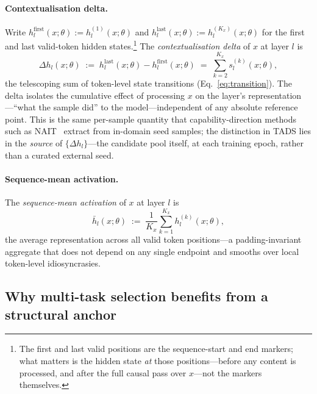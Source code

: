 \paragraph{Contextualisation delta.}
Write $h_l^{\mathrm{first}}(x;\theta) := h_l^{(1)}(x;\theta)$ and
$h_l^{\mathrm{last}}(x;\theta) := h_l^{(K_x)}(x;\theta)$ for the
first and last valid-token hidden states.\footnote{The first and
last valid positions are the sequence-start and end markers; what
matters is the hidden state \emph{at} those positions---before any
content is processed, and after the full causal pass over
$x$---not the markers themselves.} The \emph{contextualisation
delta} of $x$ at layer $l$ is
\begin{equation}
  \Delta h_l(x;\theta) \;:=\;
  h_l^{\mathrm{last}}(x;\theta) - h_l^{\mathrm{first}}(x;\theta)
  \;=\; \sum_{k=2}^{K_x} s_l^{(k)}(x;\theta),
  \label{eq:delta}
\end{equation}
the telescoping sum of token-level state transitions
(Eq.~\ref{eq:transition}). The delta isolates the cumulative effect
of processing $x$ on the layer's representation---``what the sample
did'' to the model---independent of any absolute reference point.
This is the same per-sample quantity that capability-direction
methods such as NAIT~\citep{nait2026} extract from in-domain seed
samples; the distinction in \textsc{TADS} lies in the \emph{source}
of $\{\Delta h_l\}$---the candidate pool itself, at each training
epoch, rather than a curated external seed.

\paragraph{Sequence-mean activation.}
The \emph{sequence-mean activation} of $x$ at layer $l$ is
\begin{equation}
  \bar h_l(x;\theta) \;:=\;
  \frac{1}{K_x}\sum_{k=1}^{K_x} h_l^{(k)}(x;\theta),
  \label{eq:meanact}
\end{equation}
the average representation across all valid token positions---a
padding-invariant aggregate that does not depend on any single
endpoint and smooths over local token-level idiosyncrasies.

\subsection{Why multi-task selection benefits from a structural anchor}
\label{sec:method-motivation}

